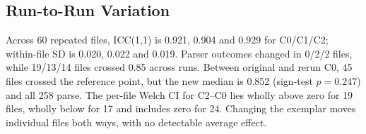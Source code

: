 \subsection{Run-to-Run Variation}
\label{sec:res-rep}

Across 60 repeated files, ICC(1,1) is 0.921, 0.904 and 0.929 for C0/C1/C2; within-file SD is 0.020, 0.022 and 0.019. Parser outcomes changed in 0/2/2 files, while 19/13/14 files crossed 0.85 across runs. Between original and rerun C0, 45 files crossed the reference point, but the new median is 0.852 (sign-test $p=0.247$) and all 258 parse. The per-file Welch CI for C2--C0 lies wholly above zero for 19 files, wholly below for 17 and includes zero for 24. Changing the exemplar moves individual files both ways, with no detectable average effect.

